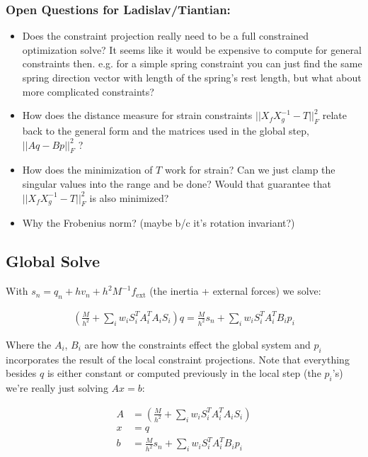\documentclass[11pt]{article}
\begin{document}
\subsubsection*{Open Questions for Ladislav/Tiantian:}
\begin{itemize}
	\item Does the constraint projection really need to be a full constrained optimization solve? It seems
		like it would be expensive to compute for general constraints then. e.g. for a simple spring constraint
		you can just find the same spring direction vector with length of the spring's rest length, but what
		about more complicated constraints?

	\item How does the distance measure for strain constraints $|| X_f X^{-1}_g - T ||^2_F$ relate back to the
		general form and the matrices used in the global step, $||Aq - Bp||^2_F$ ?

	\item How does the minimization of $T$ work for strain? Can we just clamp the singular values into the
		range and be done? Would that guarantee that $|| X_f X^{-1}_g - T ||^2_F$ is also minimized?

	\item Why the Frobenius norm? (maybe b/c it's rotation invariant?)
\end{itemize}

\subsection{Global Solve}

With $s_n = q_n + h v_n + h^2 M^{-1} f_{\text{ext}}$ (the inertia + external forces) we solve:

\begin{align}
	\left(\frac{M}{h^2} + \sum_i w_i S^T_i A^T_i A_i S_i \right) q =
		\frac{M}{h^2} s_n + \sum_i w_i S^T_i A^T_i B_i p_i
\end{align}

Where the $A_i$, $B_i$ are how the constraints effect the global system and $p_i$ incorporates the
result of the local constraint projections. Note that everything besides $q$ is either constant or
computed previously in the local step (the $p_i$'s) we're really just solving $A x = b$:

\begin{align*}
	A &= \left(\frac{M}{h^2} + \sum_i w_i S^T_i A^T_i A_i S_i \right) \\
	x &= q \\
	b &= \frac{M}{h^2} s_n + \sum_i w_i S^T_i A^T_i B_i p_i
\end{align*}
\end{document}
